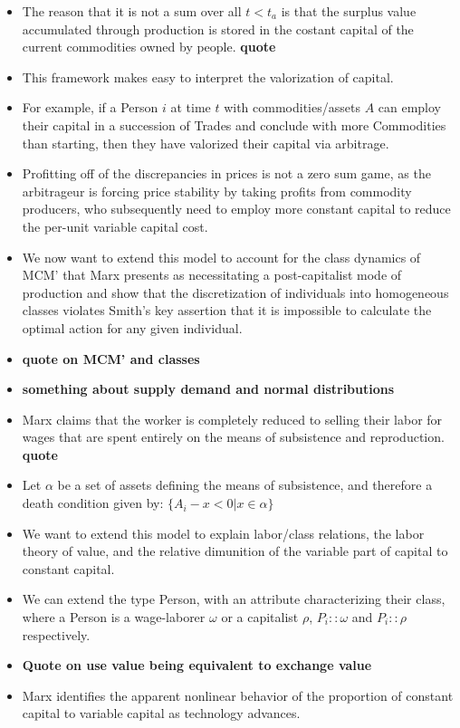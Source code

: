 \documentclass[12pt]{article}
\begin{document}
\begin{itemize}
    \item The reason that it is not a sum over all $t < t_a$ is that the surplus value accumulated through production is stored in the costant capital of the current commodities owned by people. \textbf{quote}
    \item This framework makes easy to interpret the valorization of capital.
    \item For example, if a Person $i$ at time $t$ with commodities/assets $A$ can employ their capital in a succession of Trades and conclude with more Commodities than starting, then they have valorized their capital via arbitrage.
    \item  Profitting off of the discrepancies in prices is not a zero sum game, as the arbitrageur is forcing price stability by taking profits from commodity producers, who subsequently need to employ more constant capital to reduce the per-unit variable capital cost.
    \item We now want to extend this model to account for the class dynamics of MCM' that Marx presents as necessitating a post-capitalist mode of production and show that the discretization of individuals into homogeneous classes violates Smith's key assertion that it is impossible to calculate the optimal action for any given individual. 
    \item \textbf{quote on MCM' and classes}
    \item \textbf{something about supply demand and normal distributions}
    \item Marx claims that the worker is completely reduced to selling their labor for wages that are spent entirely on the means of subsistence and reproduction. \textbf{quote}
    \item Let $\alpha$ be a set of assets defining the means of subsistence, and therefore a death condition given by: $\{A_i - x < 0| x \in \alpha \}$  
    \item We want to extend this model to explain labor/class relations, the labor theory of value, and the relative dimunition of the variable part of capital to constant capital.
    \item We can extend the type Person, with an attribute characterizing their class, where a Person is a wage-laborer $\omega$ or a capitalist $\rho$, $P_i::\omega$ and $P_i::\rho$ respectively.
    \item \textbf{Quote on use value being equivalent to exchange value}
    \item Marx identifies the apparent nonlinear behavior of the proportion of constant capital to variable capital as technology advances.

\end{itemize}
\end{document}
